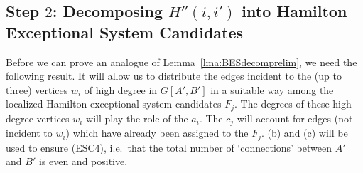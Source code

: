 \documentclass{memo-l}
\numberwithin{section}{chapter}
\numberwithin{equation}{section}
\numberwithin{firstthm}{section}
\numberwithin{figure}{section}
\begin{document}
{%

\subsection{Step $2$: Decomposing $H''(i,i')$ into Hamilton Exceptional System Candidates}


Before we can prove an analogue of Lemma~\ref{lma:BESdecomprelim}, we need the following result.
It will allow us to distribute the edges incident to the (up to three) vertices $w_i$ of high degree in $G[A',B']$ in a suitable way
among the localized Hamilton exceptional system candidates $F_j$.
The degrees of these high degree vertices $w_i$ will play the role of the $a_i$.
The $c_j$ will account for edges (not incident to $w_i$) which have already been assigned to the $F_j$.
(b) and (c) will be used to ensure  (ESC4), i.e.~that the total number of `connections' between $A'$ and $B'$ is even and positive.

}
\end{document}
